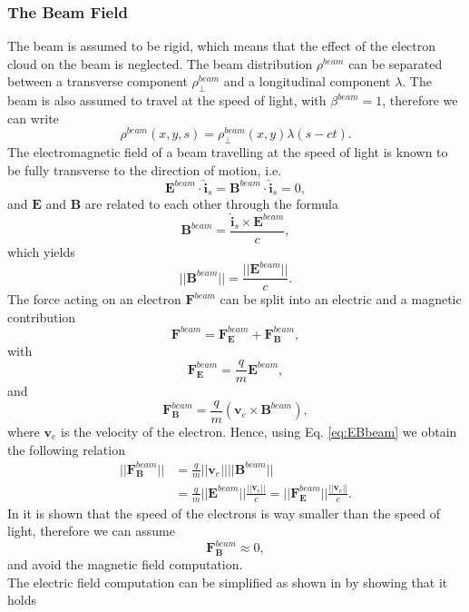 \subsubsection{The Beam Field}
The beam is assumed to be rigid, which means that the effect of the electron cloud on the beam is neglected. The beam distribution $\rho^{beam}$ can be separated between a transverse component $\rho^{beam}_{\perp}$ and a longitudinal component $\lambda$. The beam is also assumed to travel at the speed of light, with $\beta^{beam} = 1$, therefore we can write
$$\rho^{beam}(x, y, s) = \rho^{beam}_{\perp}(x, y)\lambda(s - c t).$$
The electromagnetic field of a beam travelling at the speed of light is known to be fully transverse to the direction of motion, i.e.
$$\mathbf{E}^{beam}\cdot\hat{\mathbf{i}}_s = \mathbf{B}^{beam}\cdot\hat{\mathbf{i}}_s = 0,$$ and $\mathbf{E}$ and $\mathbf{B}$ are related to each other through the formula $$\mathbf{B}^{beam} = \frac{\hat{\mathbf{i}}_s\times\mathbf{E}^{beam}}{c},$$ which yields 
\begin{equation}
    \label{eq:EBbeam}
    ||\mathbf{B}^{beam}|| = \frac{||\mathbf{E}^{beam}||}{c}.
\end{equation}
The force acting on an electron $\mathbf{F}^{beam}$ can be split into an electric and a magnetic contribution $$\mathbf{F}^{beam} = \mathbf{F}^{beam}_{\mathbf{E}} + \mathbf{F}^{beam}_{\mathbf{B}},$$
with $$\mathbf{F}^{beam}_{\mathbf{E}} = \frac{q}{m}\mathbf{E}^{beam},$$ and $$\mathbf{F}^{beam}_{\mathbf{B}} = \frac{q}{m}\left(\mathbf{v}_e\times\mathbf{B}^{beam}\right),$$
where $\mathbf{v}_e$ is the velocity of the electron. Hence, using Eq. \ref{eq:EBbeam} we obtain the following relation
\begin{equation*}
    \begin{split}
        ||\mathbf{F}^{beam}_{\mathbf{B}}|| &= \frac{q}{m} ||\mathbf{v}_e||||\mathbf{B}^{beam}|| \\
                                           &= \frac{q}{m} ||\mathbf{E}^{beam}|| \frac{||\mathbf{v}_e||}{c} = ||\mathbf{F}^{beam}_{\mathbf{E}}|| \frac{||\mathbf{v}_e||}{c}.
    \end{split}
\end{equation*}
In \cite{Iadarola:thesis} it is shown that the speed of the electrons is way smaller than the speed of light, therefore we can assume $$\mathbf{F}^{beam}_{\mathbf{B}} \approx 0,$$
and avoid the magnetic field computation.\\
The electric field computation can be simplified as shown in \cite{Iadarola:boostedframe} by showing that it holds
